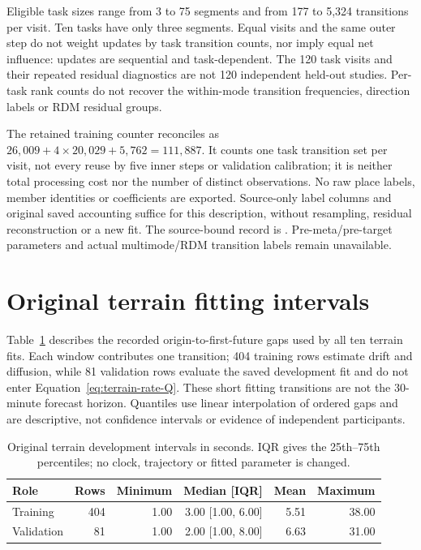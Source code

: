 Eligible task sizes range from 3 to 75 segments and from 177 to 5,324
transitions per visit. Ten tasks have only three segments. Equal visits
and the same outer step do not weight updates by task transition counts,
nor imply equal net influence: updates are sequential and task-dependent.
The 120 task visits and their repeated residual diagnostics are not 120
independent held-out studies. Per-task rank counts do not recover the
within-mode transition frequencies, direction labels or RDM residual groups.

The retained training counter reconciles as
\(26{,}009+4\times20{,}029+5{,}762=111{,}887\).
It counts one task transition set per visit, not every reuse by five inner
steps or validation calibration; it is neither total processing cost nor
the number of distinct observations. No raw place labels, member identities
or coefficients are exported. Source-only label columns and original saved
accounting suffice for this description, without resampling, residual
reconstruction or a new fit. The source-bound record is
. Pre-meta/pre-target
parameters and actual multimode/RDM transition labels remain unavailable.


\section{Original terrain fitting intervals}
\label{sec:terrain-fit-intervals}\hypertarget{sec:terrain-fit-intervals}{}
Table~\ref{tab:terrain-fit-intervals} describes the recorded origin-to-first-future
gaps used by all ten terrain fits. Each window contributes one transition;
404 training rows estimate drift and diffusion, while 81 validation rows
evaluate the saved development fit and do not enter Equation~\eqref{eq:terrain-rate-Q}.
These short fitting transitions are not the 30-minute forecast horizon.
Quantiles use linear interpolation of ordered gaps and are descriptive,
not confidence intervals or evidence of independent participants.

\begin{table}[htbp]
\centering\footnotesize
\caption{Original terrain development intervals in seconds. IQR gives
the 25th--75th percentiles; no clock, trajectory or fitted parameter is changed.}
\label{tab:terrain-fit-intervals}\hypertarget{tab:terrain-fit-intervals}{}
\begin{tabular}{lrrrrr}
\toprule
Role & Rows & Minimum & Median [IQR] & Mean & Maximum\\
\midrule
Training & 404 & 1.00 & 3.00 [1.00, 6.00] & 5.51 & 38.00\\
Validation & 81 & 1.00 & 2.00 [1.00, 8.00] & 6.63 & 31.00\\
\bottomrule
\end{tabular}
\end{table}

